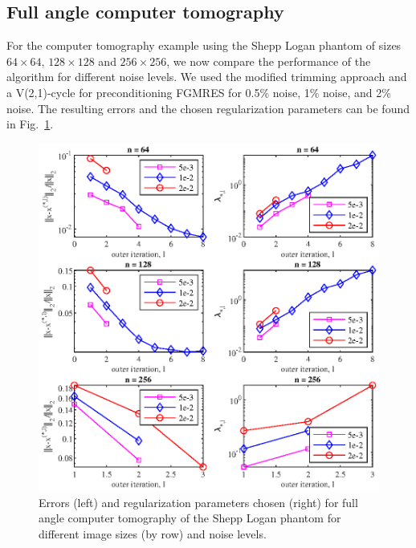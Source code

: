 \subsection{Full angle computer tomography}
For the computer tomography example using the Shepp Logan phantom of sizes $64 \times 64$, $128 \times 128$ and $256 \times 256$, we now compare the performance of the algorithm for different noise levels. We used the modified trimming approach and a V(2,1)-cycle for preconditioning FGMRES for 0.5\% noise, 1\% noise, and 2\% noise. The resulting errors and the chosen regularization parameters can be found in Fig.~\ref{fig:shepp_logan_errs_and_reg_params}.
\begin{figure}[htbp]
\begin{center}
\includegraphics{figures/shepp_logan_errs_and_reg_params}
\caption{Errors (left) and regularization parameters chosen (right) for full angle computer tomography of the Shepp Logan phantom for different image sizes (by row) and noise levels.}
\label{fig:shepp_logan_errs_and_reg_params}
\end{center}
\end{figure}

